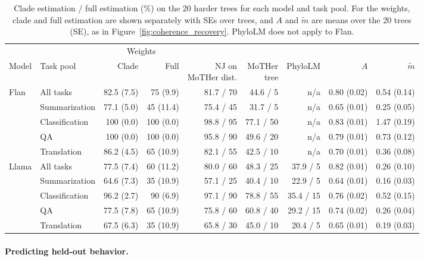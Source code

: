 \documentclass{article}
\theoremstyle{definition}
\theoremstyle{plain}
\newif\ifrevision
\newcommand{\rev}[1]{\ifrevision{\color{blue}#1}\else#1\fi}
\newcommand{\revcolor}{\ifrevision\color{blue}\fi}
\newcommand{\revtag}[1]{\ifrevision\textsuperscript{\color{blue}\sffamily\scriptsize[#1]}\fi}
\begin{document}
\begin{table}[t]
{\revcolor
\caption{\rev{Clade estimation / full estimation (\%) on the 20 harder trees for each model and task pool. For the weights, clade and full estimation are shown separately with SEs over trees, and $A$ and $\widetilde m$ are means over the 20 trees (SE), as in Figure~\ref{fig:coherence_recovery}. PhyloLM does not apply to Flan.}\revtag{tWEn W1, W2; S8sV Q2}}
\label{tab:stress}
\centering
\small
\setlength{\tabcolsep}{3pt}
\begin{tabular}{llrrrrrrr}
\toprule
 & & \multicolumn{2}{c}{Weights} & & & & & \\
\cmidrule(lr){3-4}
Model & Task pool & Clade & Full & \shortstack{NJ on\\MoTHer dist.} & \shortstack{MoTHer\\tree} & PhyloLM & $A$ & $\widetilde m$ \\
\midrule
Flan & All tasks & 82.5 (7.5) & 75 (9.9) & 81.7 / 70 & 44.6 / 5 & n/a & 0.80 (0.02) & 0.54 (0.14) \\
 & Summarization & 77.1 (5.0) & 45 (11.4) & 75.4 / 45 & 31.7 / 5 & n/a & 0.65 (0.01) & 0.25 (0.05) \\
 & Classification & 100 (0.0) & 100 (0.0) & 98.8 / 95 & 77.1 / 50 & n/a & 0.83 (0.01) & 1.47 (0.19) \\
 & QA & 100 (0.0) & 100 (0.0) & 95.8 / 90 & 49.6 / 20 & n/a & 0.79 (0.01) & 0.73 (0.12) \\
 & Translation & 86.2 (4.5) & 65 (10.9) & 82.1 / 55 & 42.5 / 10 & n/a & 0.70 (0.01) & 0.36 (0.08) \\
\midrule
Llama & All tasks & 77.5 (7.4) & 60 (11.2) & 80.0 / 60 & 48.3 / 25 & 37.9 / 5 & 0.82 (0.01) & 0.26 (0.10) \\
 & Summarization & 64.6 (7.3) & 35 (10.9) & 57.1 / 25 & 40.4 / 10 & 22.9 / 5 & 0.64 (0.01) & 0.16 (0.03) \\
 & Classification & 96.2 (2.7) & 90 (6.9) & 97.1 / 90 & 78.8 / 55 & 35.4 / 15 & 0.76 (0.02) & 0.52 (0.15) \\
 & QA & 77.5 (7.8) & 65 (10.9) & 75.8 / 60 & 60.8 / 40 & 29.2 / 15 & 0.74 (0.02) & 0.26 (0.04) \\
 & Translation & 67.5 (6.3) & 35 (10.9) & 65.8 / 30 & 45.0 / 10 & 20.4 / 5 & 0.65 (0.01) & 0.19 (0.03) \\
\bottomrule
\end{tabular}\par
}
\end{table}


\paragraph{Predicting held-out behavior.}
\label{sec:results:behavioral}
\end{document}
